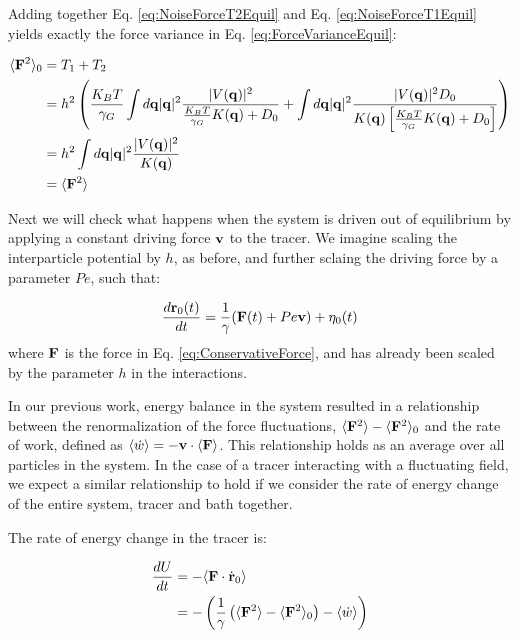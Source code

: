 \documentclass[amsmath,preprintnumbers,10pt,article,notitlepage]{revtex4-1}
\begin{document}
Adding together Eq. \ref{eq:NoiseForceT2Equil} and Eq. \ref{eq:NoiseForceT1Equil} yields exactly the force variance in Eq. \ref{eq:ForceVarianceEquil}:


\begin{align}
\langle {\bf F}^2 \rangle_0 & = T_1 + T_2 \\
& = h^2 \left( \frac{K_BT}{\gamma_G} \int d{\bf q} |{\bf q}|^2  \dfrac{ |V({\bf q})|^2}{ \frac{K_BT}{\gamma_G} K({\bf q}) + D_0} + \int d{\bf q} |{\bf q}|^2  \dfrac{|V({\bf q})|^2 D_0}{K({\bf q})\left[\frac{K_BT}{\gamma_G} K({\bf q}) + D_0\right]} \right) \\
& = h^2 \int d{\bf q} |{\bf q}|^2 \frac{ |V({\bf q})|^2}{K({\bf q})} \\
& = \langle {\bf F}^2 \rangle
\label{eq:VerifyingFDT}
\end{align}



Next we will check what happens when the system is driven out of equilibrium by applying a constant driving force ${\bf v}$ to the tracer. We imagine scaling the interparticle potential by $h$, as before, and further sclaing the driving force by a parameter $Pe$, such that:

\begin{equation}
\dfrac{d {\bf r}_0(t)}{dt} = \dfrac{1}{\gamma}( {\bf F}(t) + Pe {\bf v}) + \eta_0(t)
\end{equation}
where ${\bf F}$ is the force in Eq. \ref{eq:ConservativeForce}, and has already been scaled by the parameter $h$ in the interactions.


In our previous work, energy balance in the system resulted in a relationship between the renormalization of the force fluctuations, $\langle {\bf F}^2 \rangle - \langle {\bf F}^2 \rangle_0$ and the rate of work, defined as $ \langle \dot{w} \rangle = -{\bf v} \cdot \langle {\bf F} \rangle$. This relationship holds as an average over all particles in the system. In the case of a tracer interacting with a fluctuating field, we expect a similar relationship to hold if we consider the rate of energy change of the entire system, tracer and bath together.

The rate of energy change in the tracer is:

\begin{align}
\dfrac{d U}{d t} & = -\langle {\bf F} \cdot \dot {\bf r}_0 \rangle \\
& = -\left( \dfrac{1}{\gamma} \left( \langle {\bf F} ^2 \rangle - \langle {\bf F} ^2 \rangle_0 \right) - \langle \dot{w} \rangle \right) 
\end{align}
\end{document}
